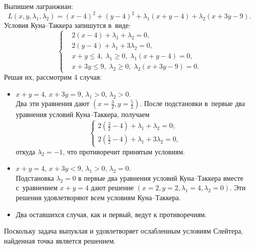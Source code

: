 \documentclass[12pt,fleqn]{article}
\begin{document}
\begin{esSolution}
Выпишем лагранжиан:
    \[
        L(x, y, \lambda_1, \lambda_2)
        =
        (x-4)^2 + (y-4)^2 + \lambda_1(x+y-4) + \lambda_2(x+3y-9).
    \]
Условия Куна--Таккера запишутся в~виде:
\[
    \left\{
        \begin{aligned}
            & 2(x-4)+\lambda_1+\lambda_2 = 0, \\
            & 2(y-4)+\lambda_1+3\lambda_2 = 0, \\
            & x+y \leq 4,\; \lambda_1 \geqslant 0,\; \lambda_1(x+y -4)=0, \\
            & x+3y \leq 9,\; \lambda_2 \geqslant 0,\; \lambda_2(x+3y -9)=0.
        \end{aligned}
    \right.
\]
Решая их, рассмотрим 4 случая:
\begin{itemize}
\item
    $x+y = 4$,\: $x+3y = 9$,\: $\lambda_1>0$,\: $\lambda_2>0$.\\
    Два эти уравнения дают $(x=\frac32,y=\frac52)$.
    После подстановки в~первые два уравнения условий Куна--Таккера, получаем
    \[
    \begin{cases}
    2(\frac32-4)+\lambda_1+\lambda_2 = 0;\\
    2(\frac52-4)+\lambda_1+3\lambda_2 = 0,
    \end{cases}
    \]
    откуда $\lambda_2 = -1$, что противоречит принятым условиям.
\item
    $x+y = 4$,\: $x+3y < 9$,\: $\lambda_1>0$,\: $\lambda_2=0$.\\
    Подстановка $\lambda_2=0$ в первые два уравнения условий Куна--Таккера вместе с~уравнением $x+y = 4$ дают решение $(x=2, y=2, \lambda_1 = 4, \lambda_2=0)$.
    Эти решения удовлетворяют всем условиям Куна--Таккера.
\item
    Два оставшихся случая, как и первый, ведут к противоречиям.
\end{itemize}

Поскольку задача выпуклая и удовлетворяет ослабленным условиям Слейтера,
найденная точка является решением.
\end{esSolution}
\end{document}
